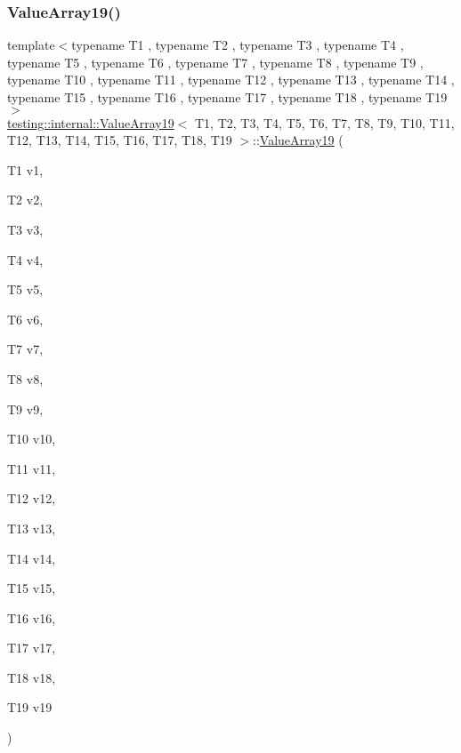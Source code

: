 \subsubsection{\texorpdfstring{ValueArray19()}{ValueArray19()}\hspace{0.1cm}{\footnotesize\ttfamily [1/2]}}
{\footnotesize\ttfamily template$<$typename T1 , typename T2 , typename T3 , typename T4 , typename T5 , typename T6 , typename T7 , typename T8 , typename T9 , typename T10 , typename T11 , typename T12 , typename T13 , typename T14 , typename T15 , typename T16 , typename T17 , typename T18 , typename T19 $>$ \\
\mbox{\hyperlink{classtesting_1_1internal_1_1ValueArray19}{testing\+::internal\+::\+Value\+Array19}}$<$ T1, T2, T3, T4, T5, T6, T7, T8, T9, T10, T11, T12, T13, T14, T15, T16, T17, T18, T19 $>$\+::\mbox{\hyperlink{classtesting_1_1internal_1_1ValueArray19}{Value\+Array19}} (\begin{DoxyParamCaption}\item[{T1}]{v1,  }\item[{T2}]{v2,  }\item[{T3}]{v3,  }\item[{T4}]{v4,  }\item[{T5}]{v5,  }\item[{T6}]{v6,  }\item[{T7}]{v7,  }\item[{T8}]{v8,  }\item[{T9}]{v9,  }\item[{T10}]{v10,  }\item[{T11}]{v11,  }\item[{T12}]{v12,  }\item[{T13}]{v13,  }\item[{T14}]{v14,  }\item[{T15}]{v15,  }\item[{T16}]{v16,  }\item[{T17}]{v17,  }\item[{T18}]{v18,  }\item[{T19}]{v19 }\end{DoxyParamCaption})\hspace{0.3cm}{\ttfamily [inline]}}

\mbox{\label{classtesting_1_1internal_1_1ValueArray19_a1029ebc5d39633e2fb278e051d0ec1d0}} 

